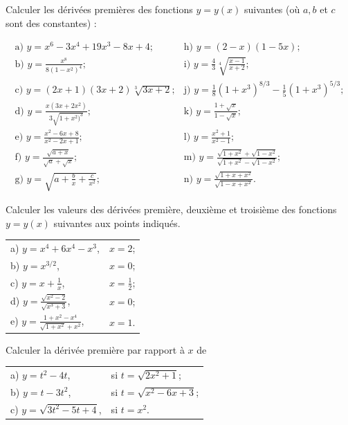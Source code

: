 \documentclass[12pt,french,oneside,a4paper]{memoir} %
\begin{document}
\begin{exo}
Calculer les dérivées premières des fonctions $y=y(x)$
 suivantes (où $a, b$ et $c$ sont des constantes) :
 
 \begin{equation*}
 \begin{array}{ll}
 \mbox{a) }\displaystyle{y=x^6-3x^4+19x^3-8x+4};\qquad&\mbox{h)
 }y=(2-x)(1-5x);\\[3mm]
 \mbox{b) }\displaystyle{y=\frac{x^8}{8(1-x^2)^4}};&
 \mbox{i)
 }\displaystyle{y=\frac{4}{3}\sqrt[4]{\frac{x-1}{x+2}}};\\[3mm]
 \mbox{c) }\displaystyle{y=(2x+1)(3x+2)\sqrt[3]{3x+2}};&
 \mbox{j)
 }\displaystyle{y=\frac{1}{8}(1+x^3)^{8/3}-\frac{1}{5}(1+x^3)^{5/3}};\\[3mm]
 \mbox{d) }\displaystyle{y=\frac{x(3x+2x^2)}{3\sqrt{1+x^2)^3}}};&
 \mbox{k) }\displaystyle{y=\frac{1+\sqrt x}{1-\sqrt x}};\\[3mm]
 \mbox{e) }\displaystyle{y=\frac{x^2-6x+8}{x^2-2x+1}};&
 \mbox{l) }\displaystyle{y=\frac{x^2+1}{x^2-1}};\\[3mm]
 \mbox{f) }\displaystyle{y=\frac{\sqrt{a+x}}{\sqrt a+\sqrt x}};&
 \mbox{m)
 }\displaystyle{y=\frac{\sqrt{1+x^2}+\sqrt{1-x^2}}
 {\sqrt{1+x^2}-\sqrt{1-x^2}}};\\[3mm]
 \mbox{g) }\displaystyle{y=\sqrt{a+\frac{b}{x}+\frac{c}{x^2}}};&
 \mbox{n) }\displaystyle{y=\frac{\sqrt{1+x+x^2}}{\sqrt{1-x+x^2}}}.
 \end{array}
\end{equation*}
\end{exo}
\begin{exo}
Calculer les valeurs des dérivées première, deuxième
 et troisième des fonctions $y=y(x)$ suivantes aux points
 indiqués.\\
 
 \begin{tabular}{ll}
 
 a) $y=x^4+6x^4-x^3$,\qquad\qquad&$x=2$;\\[2mm]
 b) $y=x^{3/2}$,&$x=0$;\\[2mm]
 c)
 $\displaystyle{y=x+\frac{1}{x}}$,&$\displaystyle{x=\frac{1}{2}}$;\\[2mm]
 d)
 $\displaystyle{y=\frac{\sqrt{x^2-2}}{\sqrt{x^3+3}}}$,&$x=0$;\\[2mm]
 e) $\displaystyle{y=\frac{1+x^2-x^4}{\sqrt{1+x^2}+x^2}}$,&$x=1$.
 \end{tabular}
\end{exo}
\begin{exo}
Calculer la dérivée première par rapport à $x$ de
 
 \begin{tabular}{ll}
 a) $y=t^2-4t$,\qquad\qquad &si
 $\displaystyle{t=\sqrt{2x^2+1}}$;\\[2mm]
 b) $y=t-3t^2$,&si $\displaystyle{t=\sqrt{x^2-6x+3}}$;\\[2mm]
 c) $\displaystyle{y=\sqrt{3t^2-5t+4}}$,&si $t=x^2$.
 \end{tabular}
\end{exo}
\end{document}

